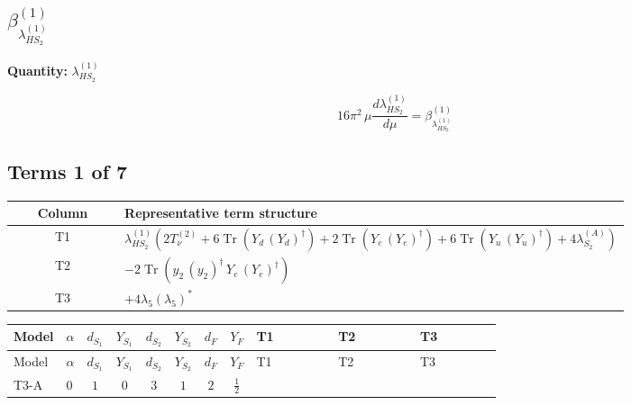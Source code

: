 \documentclass[8pt]{article}
\begin{document}
\begin{landscape}
\section*{$\beta_{\lambda_{HS_2}^{(1)}}^{(1)}$}
\noindent\textbf{Quantity: }$\lambda_{HS_2}^{(1)}$\par\smallskip
\[16\pi^2\,\mu\frac{d \lambda_{HS_2}^{(1)}}{d\mu}=\beta_{\lambda_{HS_2}^{(1)}}^{(1)}\]
\subsection*{Terms 1 of 7}
\begin{center}
\begin{tabular}{@{}c >{\raggedright\arraybackslash}p{0.82\linewidth}@{}}
\toprule
Column & Representative term structure \\
\midrule
T1 & \(\displaystyle {\lambda_{HS_2}^{(1)}} (2 T_{\nu}^{(2)}+6 \operatorname{Tr}\!\left({Y_d}\,\left({Y_d}\right)^{\dagger}\right)+2 \operatorname{Tr}\!\left({Y_e}\,\left({Y_e}\right)^{\dagger}\right)+6 \operatorname{Tr}\!\left({Y_u}\,\left({Y_u}\right)^{\dagger}\right)+4 {\lambda_{S_2}^{(A)}})\) \\
\midrule
T2 & \(\displaystyle -2 \operatorname{Tr}\!\left({y_2}\,\left({y_2}\right)^{\dagger}\,{Y_e}\,\left({Y_e}\right)^{\dagger}\right)\) \\
\midrule
T3 & \(\displaystyle +4 {\lambda_5} \left({\lambda_5}\right)^{*}\) \\
\midrule
\bottomrule
\end{tabular}
\end{center}
\smallskip
\tiny
\begin{longtable}{@{}llcccccc >{\raggedright\arraybackslash}p{0.21\linewidth} >{\raggedright\arraybackslash}p{0.21\linewidth} >{\raggedright\arraybackslash}p{0.21\linewidth}@{}}
\toprule
Model & $\alpha$ & $d_{S_1}$ & $Y_{S_1}$ & $d_{S_2}$ & $Y_{S_2}$ & $d_F$ & $Y_F$ & T1 & T2 & T3 \\
\midrule
\endfirsthead
\toprule
Model & $\alpha$ & $d_{S_1}$ & $Y_{S_1}$ & $d_{S_2}$ & $Y_{S_2}$ & $d_F$ & $Y_F$ & T1 & T2 & T3 \\
\midrule
\endhead
T3-A & $0$ & $1$ & $0$ & $3$ & $1$ & $2$ & $\frac{1}{2}$ & \scriptsize\adjustbox{max width=\linewidth}{$\begin{gathered} {\lambda_{HS_2}^{(1)}} (2 T_{\nu}^{(2)}+6 \operatorname{Tr}\!\left({Y_d}\,\left({Y_d}\right)^{\dagger}\right)+2 \operatorname{Tr}\!\left({Y_e}\,\left({Y_e}\right)^{\dagger}\right)+6 \operatorname{Tr}\!\left({Y_u}\,\left({Y_u}\right)^{\dagger}\right)+4 {\lambda_{S_2}^{(A)}})\end{gathered}$} & \scriptsize\adjustbox{max width=\linewidth}{$\begin{gathered} -2 \operatorname{Tr}\!\left({y_2}\,\left({y_2}\right)^{\dagger}\,{Y_e}\,\left({Y_e}\right)^{\dagger}\right)\end{gathered}$} & \scriptsize\adjustbox{max width=\linewidth}{$\begin{gathered} +4 {\lambda_5} \left({\lambda_5}\right)^{*}\end{gathered}$} \\

\end{longtable}
\end{landscape}
\end{document}
